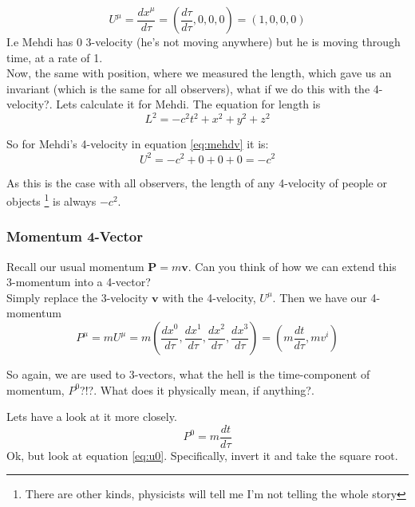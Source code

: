 \begin{equation}
  U^\mu = \frac{dx^\mu}{d\tau} = (\frac{d\tau}{d\tau}, 0,0,0) = (1,0,0,0)
  \label{eq:mehdv}
\end{equation}
I.e Mehdi has 0 3-velocity (he's not moving anywhere) but he is moving through time, at a rate of 1. \\

Now, the same with position, where we measured the length, which gave us an invariant (which is the same for all observers), what if we do this with the 4-velocity?. Lets calculate it for Mehdi. The equation for length is
\begin{equation}
  L^2 = -c^2 t^2 + x^2 + y^2 + z^2
  \label{eq:4length}
\end{equation}

So for Mehdi's 4-velocity in equation \eqref{eq:mehdv} it is:
\begin{equation}
  U^2 = -c^2 + 0 + 0 +0 = -c^2 
  \label{eq:Ulength}
\end{equation}

As this is the case with all observers, the length of any 4-velocity of people or objects \footnote{There are other kinds, physicists will tell me I'm not telling the whole story} is always $-c^2$. 


\subsubsection{Momentum 4-Vector}
Recall our usual momentum $\mathbf{P} = m \mathbf{v}$. Can you think of how we can extend this 3-momentum into a 4-vector? \\

Simply replace the 3-velocity $\mathbf{v}$ with the 4-velocity, $U^\mu$. Then we have our 4-momentum
\begin{equation}
  P^\mu = m U^\mu = m (\frac{dx^0}{d\tau}, \frac{dx^1}{d\tau},\frac{dx^2}{d\tau},\frac{dx^3}{d\tau}) = (m \frac{dt}{d\tau},m v^i)
\end{equation}

So again, we are used to 3-vectors, what the hell is the time-component of momentum, $P^0$?!?. What does it physically mean, if anything?. 

Lets have a look at it more closely.
\begin{equation}
  P^0 = m \frac{dt}{d\tau}
\end{equation}
Ok, but look at equation \eqref{eq:u0}. Specifically, invert it and take the square root. 

